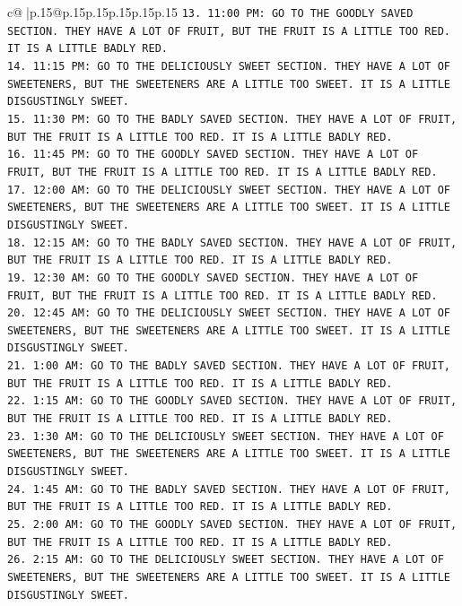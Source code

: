 \documentclass{article}
\begin{document}
{\begin{supertabular}{c@{$\;$}|p{.15\linewidth}@{}p{.15\linewidth}p{.15\linewidth}p{.15\linewidth}p{.15\linewidth}p{.15\linewidth}}
{{{\texttt{13. 11:00 PM: GO TO THE GOODLY SAVED SECTION. THEY HAVE A LOT OF FRUIT, BUT THE FRUIT IS A LITTLE TOO RED. IT IS A LITTLE BADLY RED.} \\
\texttt{14. 11:15 PM: GO TO THE DELICIOUSLY SWEET SECTION. THEY HAVE A LOT OF SWEETENERS, BUT THE SWEETENERS ARE A LITTLE TOO SWEET. IT IS A LITTLE DISGUSTINGLY SWEET.} \\
\texttt{15. 11:30 PM: GO TO THE BADLY SAVED SECTION. THEY HAVE A LOT OF FRUIT, BUT THE FRUIT IS A LITTLE TOO RED. IT IS A LITTLE BADLY RED.} \\
\texttt{16. 11:45 PM: GO TO THE GOODLY SAVED SECTION. THEY HAVE A LOT OF FRUIT, BUT THE FRUIT IS A LITTLE TOO RED. IT IS A LITTLE BADLY RED.} \\
\texttt{17. 12:00 AM: GO TO THE DELICIOUSLY SWEET SECTION. THEY HAVE A LOT OF SWEETENERS, BUT THE SWEETENERS ARE A LITTLE TOO SWEET. IT IS A LITTLE DISGUSTINGLY SWEET.} \\
\texttt{18. 12:15 AM: GO TO THE BADLY SAVED SECTION. THEY HAVE A LOT OF FRUIT, BUT THE FRUIT IS A LITTLE TOO RED. IT IS A LITTLE BADLY RED.} \\
\texttt{19. 12:30 AM: GO TO THE GOODLY SAVED SECTION. THEY HAVE A LOT OF FRUIT, BUT THE FRUIT IS A LITTLE TOO RED. IT IS A LITTLE BADLY RED.} \\
\texttt{20. 12:45 AM: GO TO THE DELICIOUSLY SWEET SECTION. THEY HAVE A LOT OF SWEETENERS, BUT THE SWEETENERS ARE A LITTLE TOO SWEET. IT IS A LITTLE DISGUSTINGLY SWEET.} \\
\texttt{21. 1:00 AM: GO TO THE BADLY SAVED SECTION. THEY HAVE A LOT OF FRUIT, BUT THE FRUIT IS A LITTLE TOO RED. IT IS A LITTLE BADLY RED.} \\
\texttt{22. 1:15 AM: GO TO THE GOODLY SAVED SECTION. THEY HAVE A LOT OF FRUIT, BUT THE FRUIT IS A LITTLE TOO RED. IT IS A LITTLE BADLY RED.} \\
\texttt{23. 1:30 AM: GO TO THE DELICIOUSLY SWEET SECTION. THEY HAVE A LOT OF SWEETENERS, BUT THE SWEETENERS ARE A LITTLE TOO SWEET. IT IS A LITTLE DISGUSTINGLY SWEET.} \\
\texttt{24. 1:45 AM: GO TO THE BADLY SAVED SECTION. THEY HAVE A LOT OF FRUIT, BUT THE FRUIT IS A LITTLE TOO RED. IT IS A LITTLE BADLY RED.} \\
\texttt{25. 2:00 AM: GO TO THE GOODLY SAVED SECTION. THEY HAVE A LOT OF FRUIT, BUT THE FRUIT IS A LITTLE TOO RED. IT IS A LITTLE BADLY RED.} \\
\texttt{26. 2:15 AM: GO TO THE DELICIOUSLY SWEET SECTION. THEY HAVE A LOT OF SWEETENERS, BUT THE SWEETENERS ARE A LITTLE TOO SWEET. IT IS A LITTLE DISGUSTINGLY SWEET.} \\
}}}
\end{supertabular}}
\end{document}
